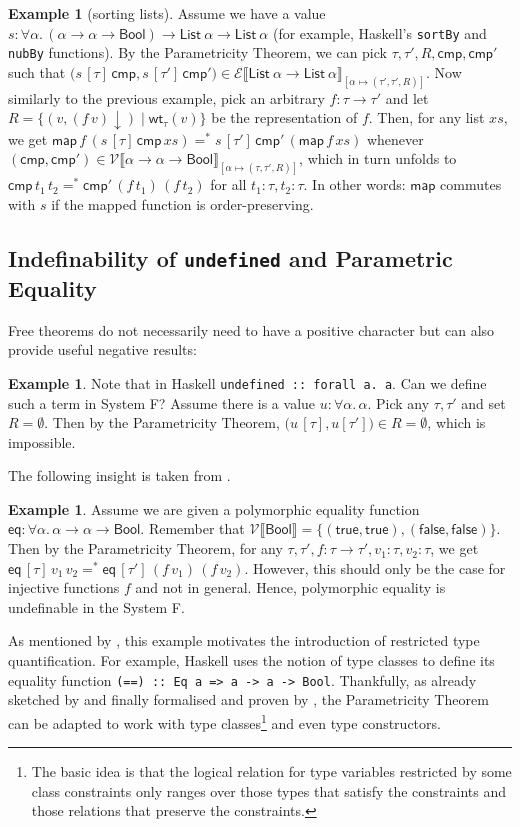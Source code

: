 \documentclass[12pt]{article}
\theoremstyle{plain}
\theoremstyle{definition}
\newtheorem{exmpl}[equation]{Example}
\newcommand{\denot}[1]{\llbracket#1\rrbracket}
\newcommand{\listt}[1]{\mathsf{List}~#1}
\newcommand{\map}{\mathsf{map}}
\newcommand{\haskell}[1]{\texttt{#1}}
\newcommand{\vint}[1]{\mathcal{V}\denot{#1}}
\newcommand{\tint}[1]{\mathcal{E}\denot{#1}}
\newcommand{\wt}[1]{\mathsf{wt}_{#1}}
\newcommand{\bool}{\mathsf{Bool}}
\newcommand{\true}{\mathsf{true}}
\newcommand{\false}{\mathsf{false}}
\newcommand{\eq}{\mathsf{eq}}
\newcommand{\cmp}{\mathsf{cmp}}
\newcommand{\nf}[1]{#1{\downarrow}}
\newcommand{\eqnf}{=^*}
\begin{document}
\begin{exmpl}[sorting lists]
Assume we have a value $s : \forall\alpha.\, (\alpha\to\alpha\to\bool)\to\listt{\alpha}\to\listt{\alpha}$
(for example, Haskell's \haskell{sortBy} and \haskell{nubBy} functions).
By the Parametricity Theorem, we can pick
$\tau,\tau',R,\cmp,\cmp'$
such that
$\bigl(s\,[\tau]\,\cmp,s\,[\tau']\,\cmp'\bigr)\in\tint{\listt{\alpha}\to\listt{\alpha}}_{[\alpha\mapsto(\tau',\tau',R)]}$.
Now similarly to the previous example,
pick an arbitrary $f : \tau\to\tau'$
and let $R=\bigl\{(v,\nf{(f\, v)})\mid \wt{\tau}(v)\bigr\}$ be the representation of $f$.
Then, for any list $xs$, we get
$\map\,f\,(s\,[\tau]\,\cmp\,xs)\eqnf s\,[\tau']\,\cmp'\,(\map\,f\,xs)$ whenever
$(\cmp,\cmp')\in\vint{\alpha\to\alpha\to\bool}_{[\alpha\mapsto(\tau,\tau',R)]}$,
which in turn unfolds to $\cmp\,t_1\,t_2\eqnf\cmp'\,(f\,t_1)\,(f\,t_2)$
for all $t_1 : \tau,t_2 : \tau$.
In other words: $\map$ commutes with $s$ if the mapped function is order-preserving.
\end{exmpl}

\subsection{Indefinability of \texttt{undefined} and Parametric Equality}\label{sec:noundef}

Free theorems do not necessarily need to have a positive character but can also provide useful negative results:

\begin{exmpl}
Note that in Haskell \haskell{undefined :: forall a. a}.
Can we define such a term in System F?
Assume there is a value $u : \forall \alpha.\, \alpha$.
Pick any $\tau,\tau'$ and set $R=\emptyset$.
Then by the Parametricity Theorem,
$\bigl(u\,[\tau],u[\tau']\bigr)\in R=\emptyset$,
which is impossible.
\end{exmpl}
The following insight is taken from \citet{wadler1989theorems}.
\begin{exmpl}
Assume we are given a polymorphic equality function $\eq : \forall \alpha.\, \alpha\to\alpha\to\bool$.
Remember that $\vint{\bool}=\{(\true,\true),(\false,\false)\}$.
Then by the Parametricity Theorem, for any $\tau,\tau',f : \tau\to\tau',v_1 : \tau,v_2 : \tau$, we get
$\eq\,[\tau]\,v_1\,v_2 \eqnf \eq\,[\tau']\,(f\,v_1)\,(f\,v_2)$.
However, this should only be the case for injective functions $f$ and not in general.
Hence, polymorphic equality is undefinable in the System F.
\end{exmpl}
As mentioned by \citet{wadler1989theorems},
this example motivates the introduction of restricted type quantification.
For example, Haskell uses the notion of type classes
\citep{typeclasses}
to define its equality function \haskell{(==) :: Eq a => a -> a -> Bool}.
Thankfully, as already sketched by
\citet{wadler1989theorems} and finally formalised and proven by \citet{voigtlander2009free},
the Parametricity Theorem can be adapted to work with type classes\footnote{The basic idea is that the logical relation for type variables restricted by some class constraints only ranges over those types that satisfy the constraints and those relations that preserve the constraints.} and even type constructors.
\end{document}
